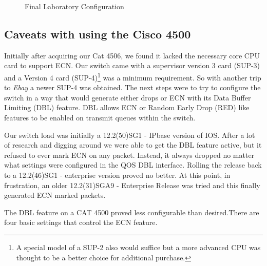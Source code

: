 \documentclass[12pt]{article}
\begin{document}
\begin{figure}[h]
\centering
{}
\caption{Final Laboratory Configuration }
\label{fig:labconfig}
\end{figure}




\subsection{Caveats with using the Cisco 4500}

Initially after acquiring our Cat 4506, we found it lacked the necessary core CPU card
to support ECN. Our switch came with a supervisor version 3 card (SUP-3) and a 
Version 4 card (SUP-4)\footnote{A special model
of a SUP-2 also would suffice but a more advanced CPU was thought to be a better
choice for additional purchase.}  was a minimum
requirement. So with another trip to \emph{Ebay} a newer SUP-4 was obtained. The
next steps were to try to configure the switch in a way that would generate either drops
or ECN with its Data Buffer Limiting (DBL) feature. DBL allows ECN or Random Early
Drop (RED) like features to be enabled on transmit queues within the switch.


Our switch load was initially a 12.2(50)SG1 - IPbase version of IOS. After
a lot of research and digging around we were able to get the DBL feature active, but it
refused to ever mark ECN on any packet. Instead, it always dropped no matter what
settings were configured in the QOS DBL interface. Rolling the release back to a 12.2(46)SG1 - enterprise version 
proved no better. At this point, in frustration, an older 12.2(31)SGA9 - Enterprise Release was tried and this finally
generated ECN marked packets. 

The DBL feature on a CAT 4500 proved less configurable than desired.There are four
basic settings that control the ECN feature. 
\end{document}
